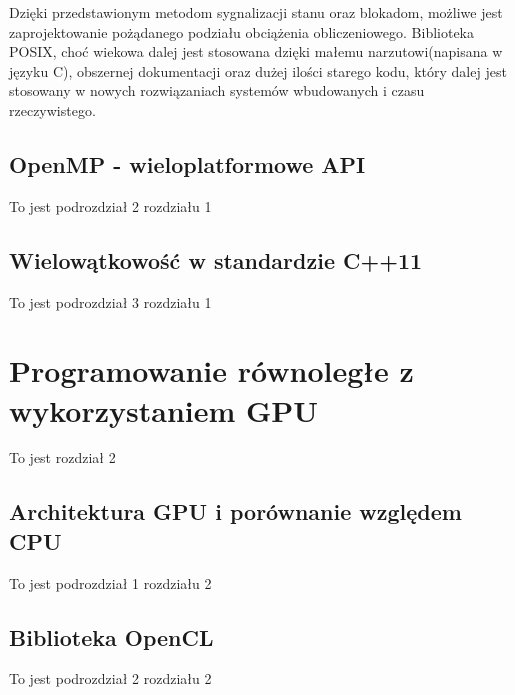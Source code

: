 \documentclass[document.tex]{subfiles}
\begin{document}
\indent Dzięki przedstawionym metodom sygnalizacji stanu oraz 
blokadom, możliwe jest zaprojektowanie pożądanego podziału obciążenia
obliczeniowego. Biblioteka POSIX, choć wiekowa dalej jest stosowana
dzięki małemu narzutowi(napisana w języku C), obszernej dokumentacji 
oraz dużej ilości starego kodu, który dalej jest stosowany w nowych
rozwiązaniach systemów wbudowanych i czasu rzeczywistego.\cite{POSIX_tutorial}
\clearpage
\subsection{OpenMP - wieloplatformowe API}
To jest podrozdział 2 rozdziału 1
\cite{openmp_pacheco}
\cite{openmp_spec}
\cite{openmp_guide}
\cite{openmp_slides}

\subsection{Wielowątkowość w standardzie C++11}
To jest podrozdział 3 rozdziału 1




\section{Programowanie równoległe z wykorzystaniem GPU}
To jest rozdział 2

\subsection{Architektura GPU i porównanie względem CPU}
To jest podrozdział 1 rozdziału 2

\subsection{Biblioteka OpenCL}
To jest podrozdział 2 rozdziału 2

\end{document}
